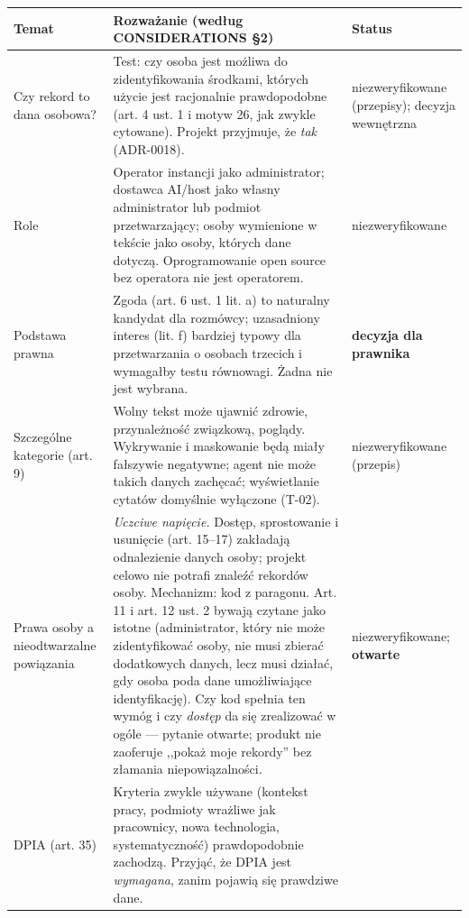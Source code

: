 \begin{table}[htbp]
\centering
\small
\begin{tabularx}{\linewidth}{@{}>{\raggedright\arraybackslash}p{3.0cm}>{\raggedright\arraybackslash}X>{\raggedright\arraybackslash}p{2.6cm}@{}}
\toprule
\textbf{Temat} & \textbf{Rozważanie (według CONSIDERATIONS §2)} & \textbf{Status} \\
\midrule
Czy rekord to dana osobowa? &
Test: czy osoba jest możliwa do zidentyfikowania środkami, których użycie jest
racjonalnie prawdopodobne (art. 4 ust. 1 i motyw 26, jak zwykle cytowane). Projekt
przyjmuje, że \emph{tak} (ADR-0018). &
niezweryfikowane (przepisy); decyzja wewnętrzna \\
\addlinespace
Role &
Operator instancji jako administrator; dostawca AI/host jako własny administrator
lub podmiot przetwarzający; osoby wymienione w tekście jako osoby, których dane
dotyczą. Oprogramowanie open source bez operatora nie jest operatorem. &
niezweryfikowane \\
\addlinespace
Podstawa prawna &
Zgoda (art. 6 ust. 1 lit. a) to naturalny kandydat dla rozmówcy; uzasadniony interes
(lit. f) bardziej typowy dla przetwarzania o osobach trzecich i wymagałby testu
równowagi. Żadna nie jest wybrana. &
\textbf{decyzja dla prawnika} \\
\addlinespace
Szczególne kategorie (art. 9) &
Wolny tekst może ujawnić zdrowie, przynależność związkową, poglądy. Wykrywanie i
maskowanie będą miały fałszywie negatywne; agent nie może takich danych
zachęcać; wyświetlanie cytatów domyślnie wyłączone (T-02). &
niezweryfikowane (przepis) \\
\addlinespace
Prawa osoby a nieodtwarzalne powiązania &
\emph{Uczciwe napięcie.} Dostęp, sprostowanie i usunięcie (art. 15--17) zakładają
odnalezienie danych osoby; projekt celowo nie potrafi znaleźć rekordów osoby.
Mechanizm: kod z paragonu. Art. 11 i art. 12 ust. 2 bywają czytane jako istotne
(administrator, który nie może zidentyfikować osoby, nie musi zbierać dodatkowych
danych, lecz musi działać, gdy osoba poda dane umożliwiające identyfikację). Czy kod
spełnia ten wymóg i czy \emph{dostęp} da się zrealizować w ogóle --- pytanie otwarte;
produkt nie zaoferuje ,,pokaż moje rekordy'' bez złamania niepowiązalności. &
niezweryfikowane; \textbf{otwarte} \\
\addlinespace
DPIA (art. 35) &
Kryteria zwykle używane (kontekst pracy, podmioty wrażliwe jak pracownicy, nowa
technologia, systematyczność) prawdopodobnie zachodzą. Przyjąć, że DPIA jest
\emph{wymagana}, zanim pojawią się prawdziwe dane. &

\end{tabularx}
\end{table}

